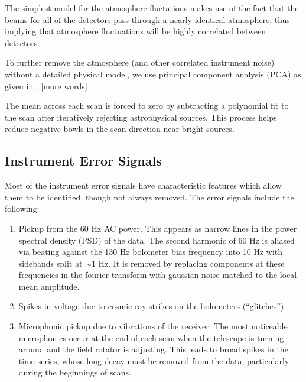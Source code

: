 \documentclass[12pt,preprint]{aastex}
\begin{document}
The simplest model for the atmosphere fluctations makes use of the
fact that the beams for all of the detectors pass through a nearly
identical atmosphere, thus implying that atmosphere fluctuations will
be highly correlated between detectors.

To further remove the atmosphere (and other correlated instrument
noise) without a detailed physical model, we use principal component
analysis (PCA) as given in \citet{laurent05}. [more words]

The mean across each scan is forced to zero by subtracting a polynomial
fit to the scan after iteratively rejecting astrophysical sources.  This
process helps reduce negative bowls in the scan direction near bright sources.


\subsection{Instrument Error Signals}

Most of the instrument error signals have characteristic features
which allow them to be identified, though not always removed.  The
error signals include the following:
\begin{enumerate}

\item Pickup from the 60 Hz AC power.  This appears as narrow lines in the power spectral density (PSD)
    of the data.  The second harmonic of 60 Hz is aliased via beating against
    the 130 Hz bolometer bias frequency into 10 Hz with sidebands split at
    $\sim1$ Hz.  It is removed by replacing components at these frequencies in
    the fourier transform with gaussian noise matched to the local mean
    amplitude.

\item Spikes in voltage due to cosmic ray strikes on the bolometers
(``glitches'').

\item Microphonic pickup due to vibrations of the receiver.  The most
noticeable microphonics occur at the end of each scan when the
telescope is turning around and the field rotator is adjusting.  This
leads to broad spikes in the time series, whose long decay must be
removed from the data, particularly during the beginnings of scans.


\end{enumerate}
\end{document}
